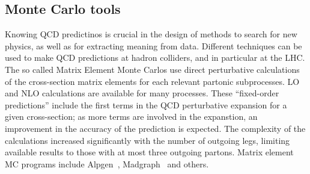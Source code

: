 \subsection{Monte Carlo tools}


Knowing QCD predictinos is crucial in the design of methods to search for new physics, as well as for extracting meaning from data. Different techniques can be used to make QCD predictions at hadron colliders, and in particular at the LHC. The so called Matrix Element Monte Carlos use direct perturbative calculations of the cross-section matrix elements  %
for each relevant partonic subprocesses. LO and NLO calculations are available for many processes.   These ``fixed-order predictions'' include the first terms in the QCD perturbative expansion for a given cross-section; as more terms are involved in the expanstion, an improvement in the accuracy of the prediction is expected.  The complexity of the calculations increased significantly with the number of outgoing legs, limiting available results to those with at most three outgoing partons. Matrix element MC programs include {\sc Alpgen}~\cite{ALPGEN}, {\sc Madgraph}~\cite{MADGRAPH} and others.


